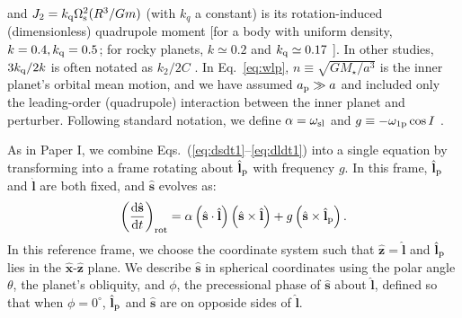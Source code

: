 \documentclass[
        fleqn,
        usenatbib,
    ]{mnras}
\newcommand*{\rd}[2]{\frac{\mathrm{d}#1}{\mathrm{d}#2}}
\newcommand*{\p}[1]{\left(#1\right)}
\newcommand*{\uv}[1]{\hat{\mathbf{#1}}}
\begin{document}
and $J_2 = k_{\rm q}\Omega_{\rm s}^2 (R^3/Gm)$ (with $k_{q}$ a constant) is its
rotation-induced (dimensionless) quadrupole moment [for a body with uniform
density, $k=0.4, k_{\rm q}=0.5$; for rocky planets, $k\simeq 0.2$ and $k_{\rm
q}\simeq 0.17$ \citep[e.g.][]{lainey2016quantification}]. In other studies,
$3k_{\rm q} / 2 k$ is often notated as $k_2 / 2C$
\citep[e.g.][]{millholland_disk}. In Eq.~\eqref{eq:wlp}, $n \equiv
\sqrt{GM_\star/a^3}$ is the inner planet's orbital mean motion,  and we have
assumed $a_{\rm p}\gg a$ and included only the leading-order (quadrupole)
interaction between the inner planet and perturber. Following standard notation,
we define $\alpha = \omega_{\rm sl}$ and $g \equiv -\omega_{\rm 1p} \cos I$
\citep[e.g.][]{colombo1966}.

As in Paper I, we combine Eqs.~(\ref{eq:dsdt1}--\ref{eq:dldt1}) into a
single equation by transforming into a frame rotating about $\uv{l}_{\rm p}$
with frequency $g$. In this frame, $\uv{l}_{\rm p}$ and $\uv{l}$ are both fixed,
and $\uv{s}$ evolves as:
\begin{equation}
    \p{\rd{\uv{s}}{t}}_{\rm rot}
        = \alpha\p{\uv{s} \cdot \uv{l}}\p{\uv{s} \times \uv{l}}
            + g\p{\uv{s} \times \uv{l}_{\rm p}}. \label{eq:dsdt_rot}
\end{equation}
In this reference frame, we choose the coordinate system such that $\uv{z} =
\uv{l}$ and $\uv{l}_{\rm p}$ lies in the $\uv{x}$-$\uv{z}$ plane. We describe
$\uv{s}$ in spherical coordinates using the polar angle $\theta$, the planet's
obliquity, and $\phi$, the precessional phase of $\uv{s}$ about $\uv{l}$,
defined so that when $\phi = 0^\circ$, $\uv{l}_{\rm p}$ and $\uv{s}$ are on
opposide sides of $\uv{l}$.
\end{document}

